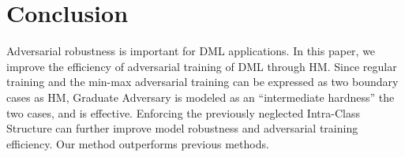\documentclass[10pt,twocolumn,letterpaper]{article}
\begin{document}
\section{Conclusion}
\label{sec:5}

Adversarial robustness is important for DML applications.
%
In this paper, we improve the efficiency of adversarial training of DML
through HM.
%
Since regular training and the min-max adversarial training can be expressed as
two boundary cases as HM, Graduate Adversary is modeled as an ``intermediate
hardness'' the two cases, and is effective.
%
Enforcing the previously neglected Intra-Class Structure can further improve 
model robustness and adversarial training efficiency.
%
Our method outperforms previous methods.

{\small


}


\end{document}
